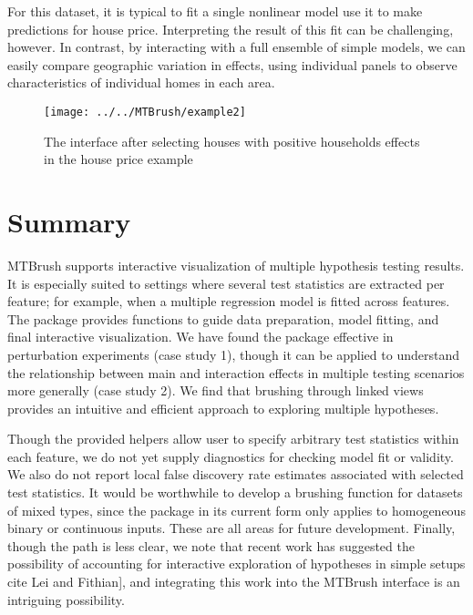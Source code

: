 For this dataset, it is typical to fit a single nonlinear model use it
to make predictions for house price. Interpreting the result of this fit
can be challenging, however. In contrast, by interacting with a full
ensemble of simple models, we can easily compare geographic variation in
effects, using individual panels to observe characteristics of
individual homes in each area.

\begin{Schunk}
\begin{figure}
\texttt{[image: ../../MTBrush/example2]} \caption[The interface after selecting houses with positive households effects in the house price example]{The interface after selecting houses with positive households effects in the house price example}\label{fig:unnamed-chunk-17}
\end{figure}
\end{Schunk}

\hypertarget{summary}{%
\section{Summary}\label{summary}}

MTBrush supports interactive visualization of multiple hypothesis
testing results. It is especially suited to settings where several test
statistics are extracted per feature; for example, when a multiple
regression model is fitted across features. The package provides
functions to guide data preparation, model fitting, and final
interactive visualization. We have found the package effective in
perturbation experiments (case study 1), though it can be applied to
understand the relationship between main and interaction effects in
multiple testing scenarios more generally (case study 2). We find that
brushing through linked views provides an intuitive and efficient
approach to exploring multiple hypotheses.

Though the provided helpers allow user to specify arbitrary test
statistics within each feature, we do not yet supply diagnostics for
checking model fit or validity. We also do not report local false
discovery rate estimates associated with selected test statistics. It
would be worthwhile to develop a brushing function for datasets of mixed
types, since the package in its current form only applies to homogeneous
binary or continuous inputs. These are all areas for future development.
Finally, though the path is less clear, we note that recent work has
suggested the possibility of accounting for interactive exploration of
hypotheses in simple setups \color{violet}{[}cite Lei and
Fithian{]}\color{black}, and integrating this work into the MTBrush
interface is an intriguing possibility.

